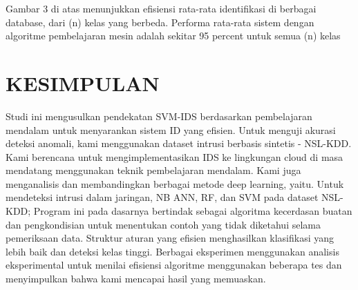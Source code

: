 \documentclass[conference]{IEEEtran}
\begin{document}
Gambar 3 di atas menunjukkan efisiensi rata-rata identifikasi di berbagai database, dari (n) kelas yang berbeda. Performa rata-rata sistem dengan algoritme pembelajaran mesin adalah sekitar 95 percent untuk semua (n) kelas

\section{KESIMPULAN}

Studi ini mengusulkan pendekatan SVM-IDS berdasarkan pembelajaran mendalam untuk menyarankan sistem ID yang efisien. Untuk menguji akurasi deteksi anomali, kami menggunakan dataset intrusi berbasis sintetis - NSL-KDD. Kami berencana untuk mengimplementasikan IDS ke lingkungan cloud di masa mendatang menggunakan teknik pembelajaran mendalam. Kami juga menganalisis dan membandingkan berbagai metode deep learning, yaitu. Untuk mendeteksi intrusi dalam jaringan, NB ANN, RF, dan SVM pada dataset NSL-KDD; Program ini pada dasarnya bertindak sebagai algoritma kecerdasan buatan dan pengkondisian untuk menentukan contoh yang tidak diketahui selama pemeriksaan data. Struktur aturan yang efisien menghasilkan klasifikasi yang lebih baik dan deteksi kelas tinggi. Berbagai eksperimen menggunakan analisis eksperimental untuk menilai efisiensi algoritme menggunakan beberapa tes dan menyimpulkan bahwa kami mencapai hasil yang memuaskan.




\vspace{12pt}
\end{document}
